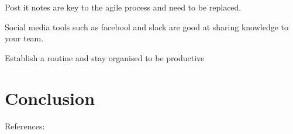 \documentclass{scrartcl}
\begin{document}
Post it notes are key to the agile process and need to be replaced.

Social media tools such as facebool and slack are good at sharing knowledge to your team.

 Establish a routine and stay organised to be productive

\section{Conclusion}


References:
\cite{bhalerao2010}
\cite{scharff2012}
\cite{abdullah2011}
\cite{joshi2013}
\cite{krasteva2008}
\cite{williams2012}
\cite{marjaie2011}
\cite{kumar2015}



\end{document}
